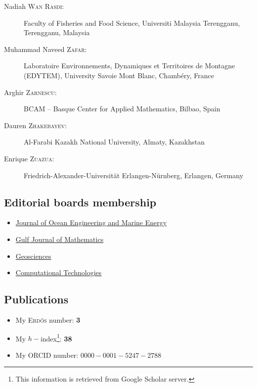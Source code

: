 \documentclass[final, a4paper, oneside, 12pt]{article}
\numberwithin{equation}{section}
\begin{document}
\begin{description}
  \item[Nadiah \textsc{Wan Rasdi}:] Faculty of Fisheries and Food Science, Universiti Malaysia Terengganu, Terengganu, Malaysia
  \item[Muhammad Naveed \textsc{Zafar}:] Laboratoire Environnements, Dynamiques et Territoires de Montagne (EDYTEM), University Savoie Mont Blanc, Chamb\'ery, France 
  \item[Arghir \textsc{Zarnescu}:] BCAM -- Basque Center for Applied Mathematics, Bilbao, Spain
  \item[Dauren \textsc{Zhakebayev}:] Al-Farabi Kazakh National University, Almaty, Kazakhstan
  \item[Enrique \textsc{Zuazua}:] Friedrich-Alexander-Universität Erlangen-Nürnberg, Erlangen, Germany

\end{description}

\subsection{Editorial boards membership}

\begin{itemize}

  \item \href{https://www.springer.com/engineering/civil+engineering/journal/40722}{Journal of Ocean Engineering and Marine Energy}
  \item \href{https://gjom.org/index.php/gjom}{Gulf Journal of Mathematics}
  \item \href{https://www.mdpi.com/journal/geosciences/}{Geosciences}
  \item \href{http://www.ict.nsc.ru/jct/}{Computational Technologies}
  
\end{itemize}

\subsection{Publications}

\begin{itemize}
  \item My \textsc{Erd\H{o}s} number: \textbf{3}
  \item My $h-$index\footnote{This information is retrieved from Google Scholar server.}: \textbf{38}
  \item My ORCID number: $0000-0001-5247-2788$
\end{itemize}
\end{document}
